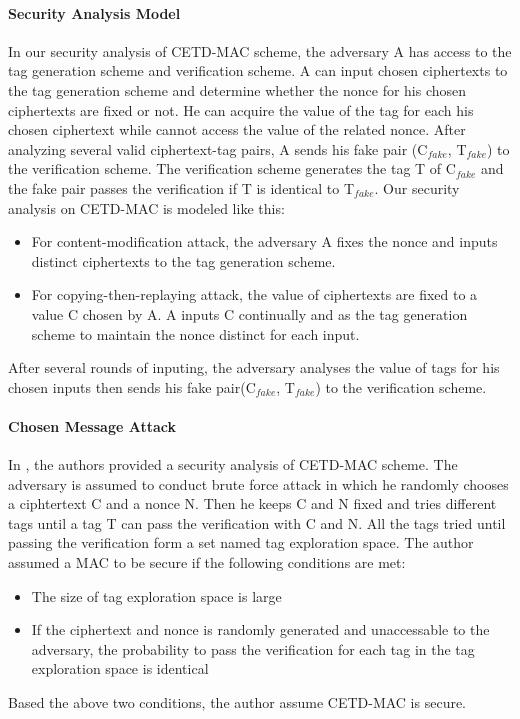 \documentclass{article}
\begin{document}
\paragraph{Security Analysis Model}
In our security analysis of CETD-MAC scheme, the adversary A has access to the tag generation scheme and verification scheme. A can input chosen ciphertexts to the tag generation scheme and determine whether the nonce for his chosen ciphertexts are fixed or not. He can acquire the value of the tag for each his chosen ciphertext while cannot access the value of the related nonce. After analyzing several valid ciphertext-tag pairs, A sends his fake pair (C$_{fake}$, T$_{fake}$) to the verification scheme. The verification scheme generates the tag T of C$_{fake}$ and the fake pair passes the verification if T is identical to T$_{fake}$. Our security analysis on CETD-MAC is modeled like this:
\begin{itemize}
	\item For content-modification attack, the adversary A fixes the nonce and inputs distinct ciphertexts to the tag generation scheme. 	
	\item For copying-then-replaying attack, the value of ciphertexts are fixed to a value C chosen by A. A inputs C continually and as the tag generation scheme to maintain the nonce distinct for each input.    
\end{itemize}
After several rounds of inputing, the adversary analyses the value of tags for his chosen inputs then sends his fake pair(C$_{fake}$, T$_{fake}$) to the verification scheme.   	

\paragraph{Chosen Message Attack}
In \cite{}, the authors provided a security analysis of CETD-MAC scheme. The adversary is assumed to conduct brute force attack in which he randomly chooses a ciphtertext C and a nonce N. Then he keeps C and N fixed and tries different tags until a tag T can pass the verification with C and N. All the tags tried until passing the verification form a set named tag exploration space. The author assumed a MAC to be secure if the following conditions are met:
\begin{itemize}
	\item The size of tag exploration space is large
	\item If the ciphertext and nonce is randomly generated and unaccessable to the adversary, the probability to pass the verification for each tag in the tag exploration space is identical
\end{itemize}
Based the above two conditions, the author assume CETD-MAC is secure.
\end{document}
